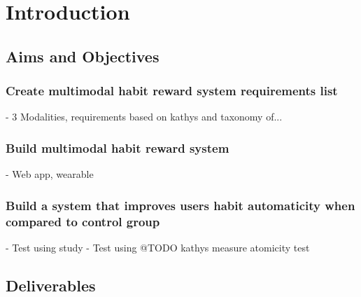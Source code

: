 
\section{Introduction}
  \subsection{Aims and Objectives}
    \subsubsection{Create multimodal habit reward system requirements list}
      - 3 Modalities, requirements based on kathys and taxonomy of...

    \subsubsection{Build multimodal habit reward system}
      - Web app, wearable

    \subsubsection{Build a system that improves users habit automaticity when compared to control group}
      - Test using study\newline
      - Test using @TODO kathys measure atomicity test

  \subsection{Deliverables}
